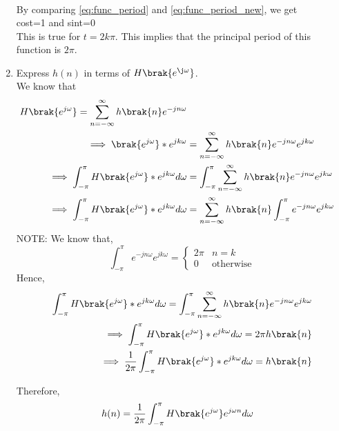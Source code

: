 \documentclass[journal,12pt,twocolumn]{IEEEtran}
\renewcommand\thesection{\arabic{section}}
\begin{document}
\begin{enumerate}[label=\thesection.\arabic*]
\begin{align}
\end{align}
By comparing \eqref{eq:func_period} and \eqref{eq:func_period_new}, we get\\
cost=1 and sint=0
\\This is true for $t=2k\pi$. This implies that the principal period of this function is $2\pi$.
\item Express $h(n)$ in terms of $H\brak{e^{\j \omega}}$.
\\\solution 
We know that\\
\begin{align}
	H\brak{e^{j\omega}}=\sum _{n= -\infty}^{\infty} h\brak{n} e^{-jn\omega }
	\\\implies\brak{e^{j\omega}}*e^{jk\omega} &= \sum _{n= -\infty}^{\infty} h\brak{n} e^{-jn\omega} e^{jk\omega}
	\\\implies\int_{-\pi}^{\pi} H\brak{e^{j\omega}}*e^{jk\omega}d\omega &= \int_{-\pi}^{\pi}\sum _{n= -\infty}^{\infty} h\brak{n} e^{-jn\omega} e^{jk\omega}
	\\\implies\int_{-\pi}^{\pi} H\brak{e^{j\omega}}*e^{jk\omega}d\omega &= \sum _{n= -\infty}^{\infty} h\brak{n}\int_{-\pi}^{\pi} e^{-jn\omega} e^{jk\omega}
\end{align}
NOTE:
We know that,
\begin{equation}
	\int_{-\pi}^{\pi} e^{-jn\omega} e^{jk\omega} 
	=
	\begin{cases}
		2\pi & n = k
		\\
		0 & \text{otherwise}
		\end{cases}
\end{equation}	
Hence,
\begin{align}
	\int_{-\pi}^{\pi} H\brak{e^{j\omega}}*e^{jk\omega}d\omega = \int_{-\pi}^{\pi}\sum _{n= -\infty}^{\infty} h\brak{n} e^{-jn\omega} e^{jk\omega}
	\\\implies \int_{-\pi}^{\pi} H\brak{e^{j\omega}}*e^{jk\omega}d\omega = 2\pi h\brak{n}
	\\\implies \frac{1}{2\pi} \int_{-\pi}^{\pi} H\brak{e^{j\omega}}*e^{jk\omega}d\omega = h\brak{n}
\end{align}
 
Therefore,\\
\begin{align}
	h(n) &= \frac{1}{2\pi}\int_{-\pi}^{\pi}H\brak{e^{j\omega}}e^{j\omega n}d\omega
\end{align}
\end{enumerate}
\end{document}
